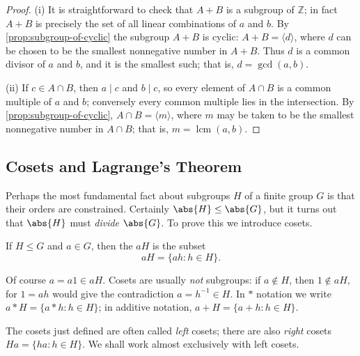 \begin{proof}
	(i) It is straightforward to check that \(A + B\) is a subgroup of \(\mathbb{Z}\); in
	fact \(A + B\) is precisely the set of all linear combinations of \(a\) and \(b\). By
	\autoref{prop:subgroup-of-cyclic} the subgroup \(A + B\) is cyclic:
	\(A + B = \langle d\rangle\), where \(d\) can be chosen to be the smallest nonnegative
	number in \(A + B\). Thus \(d\) is a common divisor of \(a\) and \(b\), and it is the
	smallest such; that is, \(d = \gcd(a,b)\).

	(ii) If \(c \in A \cap B\), then \(a \mid c\) and \(b \mid c\), so every element of
	\(A \cap B\) is a common multiple of \(a\) and \(b\); conversely every common multiple
	lies in the intersection. By \autoref{prop:subgroup-of-cyclic},
	\(A \cap B = \langle m\rangle\), where \(m\) may be taken to be the smallest
	nonnegative number in \(A \cap B\); that is, \(m = \operatorname{lcm}(a,b)\).
\end{proof}

\subsection{Cosets and Lagrange's Theorem}

Perhaps the most fundamental fact about subgroups \(H\) of a finite group \(G\) is that
their orders are constrained. Certainly \(\abs{H} \leq \abs{G}\), but it turns out that
\(\abs{H}\) must \emph{divide} \(\abs{G}\). To prove this we introduce cosets.

\begin{definition}[Coset]
	If \(H \leq G\) and \(a \in G\), then the  \(aH\) is the subset
	\[
		aH = \{ah : h \in H\}.
	\]
\end{definition}

Of course \(a = a1 \in aH\). Cosets are usually \emph{not} subgroups: if \(a \notin H\),
then \(1 \notin aH\), for \(1 = ah\) would give the contradiction \(a = h^{-1} \in H\). In
\(*\) notation we write \(a * H = \{a*h : h \in H\}\); in additive notation,
\(a + H = \{a + h : h \in H\}\).

\begin{note}
	The cosets just defined are often called \emph{left} cosets; there are also \emph{right}
	cosets \(Ha = \{ha : h \in H\}\). We shall work almost exclusively with left cosets.
\end{note}

